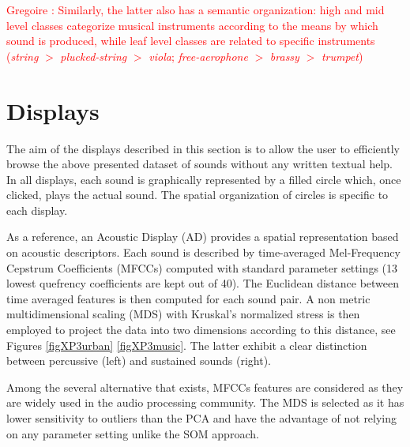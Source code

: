 \documentclass{aes2e}
\newcommand{\gl}[1]{\textcolor{red}{Gregoire : #1}}
\begin{document}
\gl{Similarly, the latter also has a semantic organization: high and mid level classes categorize musical instruments according to the means by which sound is produced, while leaf level classes are related to specific instruments (\textit{string} $>$ \textit{plucked-string} $>$ \textit{viola}; \textit{free-aerophone} $>$ \textit{brassy} $>$ \textit{trumpet})}


\section{Displays} \label{display}

The aim of the displays described in this section is to allow the user to efficiently browse the above presented dataset of sounds without any written textual help. In all displays, each sound is graphically represented by a filled circle which, once clicked, plays the actual sound. The spatial organization of circles is specific to each display.

As a reference, an Acoustic Display (AD) provides a spatial representation based on acoustic descriptors. Each sound is described by time-averaged Mel-Frequency Cepstrum Coefficients (MFCCs) computed with standard parameter settings (13 lowest quefrency coefficients are kept out of 40). The Euclidean distance between time averaged features is then computed for each sound pair. A non metric multidimensional scaling (MDS) with Kruskal's normalized stress \cite{kruskal1964multidimensional} is then employed to project the data into two dimensions according to this distance, see Figures \ref{figXP3urban} \ref{figXP3music}. The latter exhibit a clear distinction between percussive (left) and sustained sounds (right).

Among the several alternative that exists, MFCCs features are considered as they are widely used in the audio processing community. The MDS is selected as it has lower sensitivity to outliers than the PCA and have the advantage of not relying on any parameter setting unlike the SOM approach. 

\end{document}
